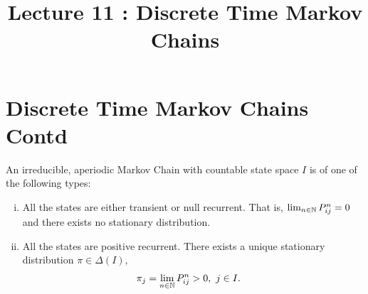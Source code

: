 \documentclass[a4paper,10pt,english]{article}
\title{Lecture 11 : Discrete Time Markov Chains}
\author{}
\begin{document}
\maketitle
\section{Discrete Time Markov Chains Contd}
\begin{thm}
An irreducible, aperiodic Markov Chain with countable state space $I$ is of one of the following types:
\begin{enumerate}[i)]
\item All the states are either transient or null recurrent. That is, $\lim_{n \in \mathbb{N}}P_{ij}^n = 0$  and there exists no stationary distribution.
\item All the states are positive recurrent. There exists a unique stationary distribution $\pi \in \Delta(I)$,
\begin{align*}
 \pi_j &= \lim_{n \in \mathbb{N}} P^n_{ij} > 0,~ j \in I.
 \end{align*}
\end{enumerate}
\end{thm}
\end{document}
